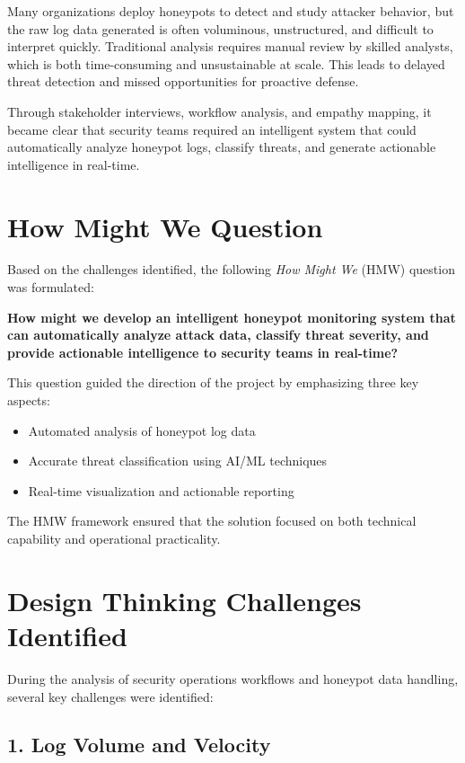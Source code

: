 \documentclass[12pt,a4paper]{report}
\begin{document}
Many organizations deploy honeypots to detect and study attacker behavior, but the raw log data generated is often voluminous, unstructured, and difficult to interpret quickly. Traditional analysis requires manual review by skilled analysts, which is both time-consuming and unsustainable at scale. This leads to delayed threat detection and missed opportunities for proactive defense.

Through stakeholder interviews, workflow analysis, and empathy mapping, it became clear that security teams required an intelligent system that could automatically analyze honeypot logs, classify threats, and generate actionable intelligence in real-time.

\section{How Might We Question}

Based on the challenges identified, the following \textit{How Might We} (HMW) question was formulated:

\textbf{How might we develop an intelligent honeypot monitoring system that can automatically analyze attack data, classify threat severity, and provide actionable intelligence to security teams in real-time?}

This question guided the direction of the project by emphasizing three key aspects:
\begin{itemize}
\item Automated analysis of honeypot log data
\item Accurate threat classification using AI/ML techniques
\item Real-time visualization and actionable reporting
\end{itemize}

The HMW framework ensured that the solution focused on both technical capability and operational practicality.

\section{Design Thinking Challenges Identified}

During the analysis of security operations workflows and honeypot data handling, several key challenges were identified:

\subsection*{1. Log Volume and Velocity}
\end{document}
